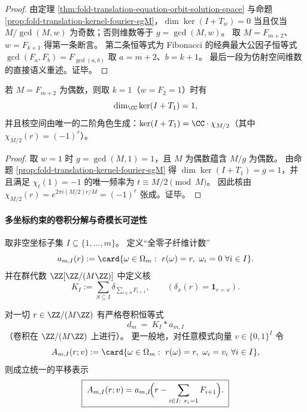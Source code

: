 \begin{proof}
由定理 \ref{thm:fold-translation-equation-orbit-solution-space} 与命题 \ref{prop:fold-translation-kernel-fourier-sgM}，\(\dim\ker(I+T_w)=0\) 当且仅当 \(M/\gcd(M,w)\) 为奇数；否则维数等于 \(g=\gcd(M,w)\)。
取 \(M=F_{m+2}\)、\(w=F_{k+1}\) 得第一条断言。
第二条恒等式为 Fibonacci 的经典最大公因子恒等式 \(\gcd(F_a,F_b)=F_{\gcd(a,b)}\) 取 \(a=m+2\)、\(b=k+1\)。
最后一段为仿射空间维数的直接语义重述。证毕。
\end{proof}

\begin{corollary}[偶模长的最小不可消自由度与奇偶角色]\label{cor:fold-fiber-even-modulus-minimal-defect-parity-character}
若 \(M=F_{m+2}\) 为偶数，则取 \(k=1\)（\(w=F_2=1\)）时有
\[
\dim_{\CC}\ker(I+T_{1})=1,
\]
并且核空间由唯一的二阶角色生成：\(\ker(I+T_1)=\CC\cdot \chi_{M/2}\)（其中 \(\chi_{M/2}(r)=(-1)^r\)）。
\end{corollary}

\begin{proof}
取 \(w=1\) 时 \(g=\gcd(M,1)=1\)，且 \(M\) 为偶数蕴含 \(M/g\) 为偶数。
由命题 \ref{prop:fold-translation-kernel-fourier-sgM} 得 \(\dim\ker(I+T_1)=g=1\)，并且满足 \(\chi_t(1)=-1\) 的唯一频率为 \(t\equiv M/2\pmod M\)。
因此核由 \(\chi_{M/2}(r)=e^{2\pi i (M/2)r/M}=(-1)^r\) 张成。证毕。
\end{proof}

\paragraph{多坐标约束的卷积分解与奇模长可逆性}
取非空坐标子集 \(I\subseteq\{1,\dots,m\}\)。
定义“全零子纤维计数”
\[
a_{m,I}(r):=\card\{\omega\in\Omega_m:\ r(\omega)=r,\ \omega_i=0\ \forall i\in I\}.
\]
并在群代数 \(\ZZ[\ZZ/(M\ZZ)]\) 中定义核
\[
K_I:=\sum_{S\subseteq I}\delta_{\sum_{i\in S}F_{i+1}},
\qquad
(\delta_x(r)=\mathbf 1_{r=x}).
\]

\begin{proposition}[有限坐标约束的卷积分解]\label{prop:fold-fiber-subset-convolution}
对一切 \(r\in\ZZ/(M\ZZ)\) 有严格卷积恒等式
\[
\boxed{\;
d_m\ =\ K_I*a_{m,I}\;}
\]
（卷积在 \(\ZZ/(M\ZZ)\) 上进行）。
更一般地，对任意模式向量 \(v\in\{0,1\}^I\) 令
\[
A_{m,I}(r;v):=\card\{\omega\in\Omega_m:\ r(\omega)=r,\ \omega_i=v_i\ \forall i\in I\},
\]
则成立统一的平移表示
\[
\boxed{\;
A_{m,I}(r;v)=a_{m,I}\!\Bigl(r-\sum_{i\in I:\ v_i=1}F_{i+1}\Bigr).\;}
\]
\end{proposition}

